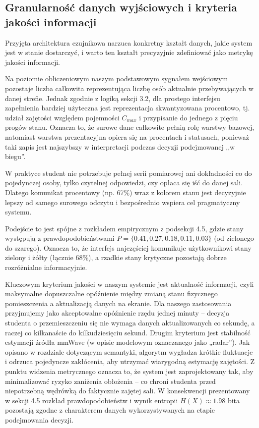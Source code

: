 \documentclass[14pt,a4paper]{extarticle}
\begin{document}
\subsection{Granularność danych wyjściowych i kryteria jakości informacji}

Przyjęta architektura czujnikowa narzuca konkretny kształt danych, jakie system jest w stanie dostarczyć, i warto ten kształt precyzyjnie zdefiniować jako metrykę jakości informacji.

Na poziomie obliczeniowym naszym podstawowym sygnałem wejściowym pozostaje liczba całkowita reprezentująca liczbę osób aktualnie przebywających w danej strefie. Jednak zgodnie z logiką sekcji 3.2, dla prostego interfejsu zapełnienia bardziej użyteczna jest reprezentacja skwantyzowana procentowo, tj. udział zajętości względem pojemności $C_{max}$ i przypisanie do jednego z pięciu progów stanu. Oznacza to, że surowe dane całkowite pełnią rolę warstwy bazowej, natomiast warstwa prezentacyjna opiera się na procentach i statusach, ponieważ taki zapis jest najszybszy w interpretacji podczas decyzji podejmowanej ,,w biegu''.

W praktyce student nie potrzebuje pełnej serii pomiarowej ani dokładności co do pojedynczej osoby, tylko czytelnej odpowiedzi, czy opłaca się iść do danej sali. Dlatego komunikat procentowy (np. 67\%) wraz z kolorem stanu jest decyzyjnie lepszy od samego surowego odczytu i bezpośrednio wspiera cel pragmatyczny systemu.

Podejście to jest spójne z rozkładem empirycznym z podsekcji 4.5, gdzie stany występują z prawdopodobieństwami $P=\{0.41,0.27,0.18,0.11,0.03\}$ (od zielonego do szarego). Oznacza to, że interfejs najczęściej komunikuje użytkownikowi stany zielony i żółty (łącznie 68\%), a rzadkie stany krytyczne pozostają dobrze rozróżnialne informacyjnie.

Kluczowym kryterium jakości w naszym systemie jest aktualność informacji, czyli maksymalne dopuszczalne opóźnienie między zmianą stanu fizycznego pomieszczenia a aktualizacją danych na ekranie. Dla naszego zastosowania przyjmujemy jako akceptowalne opóźnienie rzędu jednej minuty -- decyzja studenta o przemieszczeniu się nie wymaga danych aktualizowanych co sekundę, a raczej co kilkanaście do kilkudziesięciu sekund. Drugim kryterium jest stabilność estymacji źródła mmWave (w opisie modelowym oznaczanego jako „radar”). Jak opisano w rozdziale dotyczącym semantyki, algorytm wygładza krótkie fluktuacje i odrzuca pojedyncze zakłócenia, aby utrzymać wiarygodną estymację zajętości. Z punktu widzenia metrycznego oznacza to, że system jest zaprojektowany tak, aby minimalizować ryzyko zaniżenia obłożenia -- co chroni studenta przed niepotrzebną wędrówką do faktycznie zajętej sali. W konsekwencji prezentowany w sekcji 4.5 rozkład prawdopodobieństw i wynik entropii $H(X)\approx 1.98$ bita pozostają zgodne z charakterem danych wykorzystywanych na etapie podejmowania decyzji.
\end{document}
